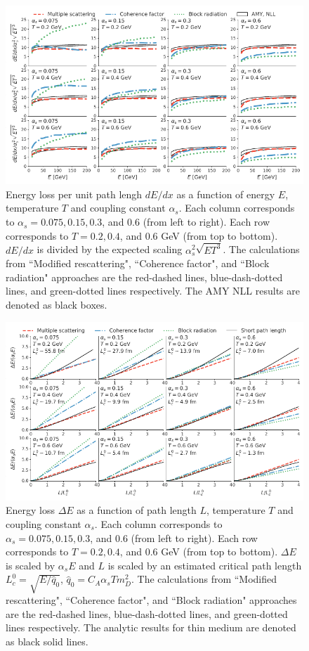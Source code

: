 \documentclass[aps, prc, reprint, amsmath, groupedaddress, nofootinbib]{revtex4-1}
\begin{document}
\begin{figure}
\includegraphics[width=\textwidth]{Eloss_infinite.pdf}
\caption{Energy loss per unit path lengh $dE/dx$ as a function of energy $E$, temperature $T$ and coupling constant $\alpha_s$. Each column corresponds to $\alpha_s = 0.075, 0.15, 0.3$, and $0.6$ (from left to right). Each row corresponds to $T = 0.2, 0.4$, and $0.6$ GeV (from top to bottom). $dE/dx$ is divided by the expected scaling $\alpha_s^2 \sqrt{ET^3}$. The calculations from ``Modified rescattering", ``Coherence factor", and ``Block radiation" approaches are the red-dashed lines, blue-dash-dotted lines, and green-dotted lines respectively. The AMY NLL results are denoted as black boxes.}
\label{fig:eloss-inf}
\end{figure}

\begin{figure}
\includegraphics[width=\textwidth]{Eloss_Ldep.pdf}
\caption{Energy loss $\Delta E$ as a function of path length $L$, temperature $T$ and coupling constant $\alpha_s$. Each column corresponds to $\alpha_s = 0.075, 0.15, 0.3$, and $0.6$ (from left to right). Each row corresponds to $T = 0.2, 0.4$, and $0.6$ GeV (from top to bottom). $\Delta E$ is scaled by $\alpha_s E$ and $L$ is scaled by an estimated critical path length $L_c^0 = \sqrt{E/\hat{q}_0}$, $\hat{q}_0 = C_A \alpha_s T m_D^2$. The calculations from ``Modified rescattering", ``Coherence factor", and ``Block radiation" approaches are the red-dashed lines, blue-dash-dotted lines, and green-dotted lines respectively. The analytic results for thin medium are denoted as black solid lines.}
\label{fig:eloss-ldep}
\end{figure}
\end{document}
